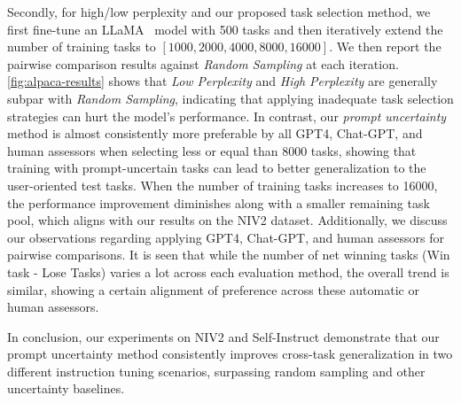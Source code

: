 Secondly, for high/low perplexity and our proposed task selection method, we first fine-tune an LLaMA~\cite{touvron2023llama} model with 500 tasks and then iteratively extend the number of training tasks to $[1000, 2000, 4000, 8000, 16000]$. We then report the pairwise comparison results against \textit{Random Sampling} at each iteration.
\autoref{fig:alpaca-results} shows that \textit{Low Perplexity} and \textit{High Perplexity} are generally subpar with \textit{Random Sampling}, indicating that applying inadequate task selection strategies can hurt the model's performance.
In contrast, our \textit{prompt uncertainty} method is almost consistently more preferable by all GPT4, Chat-GPT, and human assessors when selecting less or equal than 8000 tasks, showing that training with prompt-uncertain tasks can lead to better generalization to the user-oriented test tasks. When the number of training tasks increases to 16000, the performance improvement diminishes along with a smaller remaining task pool, which aligns with our results on the NIV2 dataset.
Additionally, we discuss our observations regarding applying GPT4, Chat-GPT, and human assessors for pairwise comparisons.
It is seen that while the number of net winning tasks (Win task - Lose Tasks) varies a lot across each evaluation method, the overall trend is similar, showing a certain alignment of preference across these automatic or human assessors.

In conclusion, our experiments on NIV2 and Self-Instruct demonstrate that our prompt uncertainty method consistently improves cross-task generalization in two different instruction tuning scenarios, surpassing random sampling and other uncertainty baselines.


